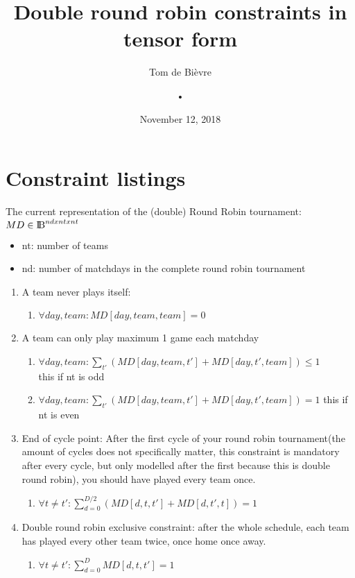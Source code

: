 \documentclass[titlepage]{article}%
\title{Double round robin constraints in tensor form}
\date{November 12, 2018}
\author{Tom de Bièvre}
\author{•}
\begin{document}
\maketitle
\section*{Constraint listings}
The current representation of the (double) Round Robin tournament: ${MD \in \rm I\!B}^{nd x nt x nt}$

\begin{itemize}  
	\item nt: number of teams
	\item nd: number of matchdays in the complete round robin tournament
\end{itemize}

\begin{enumerate}
 \item A team never plays itself: 
 \begin{enumerate}
 \item $\forall day,team : MD[day,team,team] = 0$
 \end{enumerate}
 
 \item A team can only play maximum 1 game each matchday
 \begin{enumerate}
 \item $\forall day,team : \sum\nolimits_{t'} ( MD[day,team,t'] + MD[day, t',team]) \leq 1$ \\
 this if nt is odd
 \item $\forall day,team : \sum\nolimits_{t'} ( MD[day,team,t'] + MD[day, t',team]) = 1 $ 
 this if nt is even 
 \end{enumerate}
 
 \item End of cycle point: After the first cycle of your round robin tournament(the amount of cycles does not specifically matter, this constraint is mandatory after every cycle, but only modelled after the first because this is double round robin), you should have played every team once.
 
 \begin{enumerate}
 \item $\forall t \neq t': \sum\limits_{d=0}^{D/2} (MD[d,t,t'] + MD[d,t',t]) = 1$
 \end{enumerate}
 
 \item Double round robin exclusive constraint: after the whole schedule, each team has played every other team twice, once home once away. 
 \begin{enumerate}
 \item $\forall t \neq t': \sum\limits_{d=0}^{D} MD[d,t,t'] = 1$
 \end{enumerate}


\end{enumerate}
\end{document}
